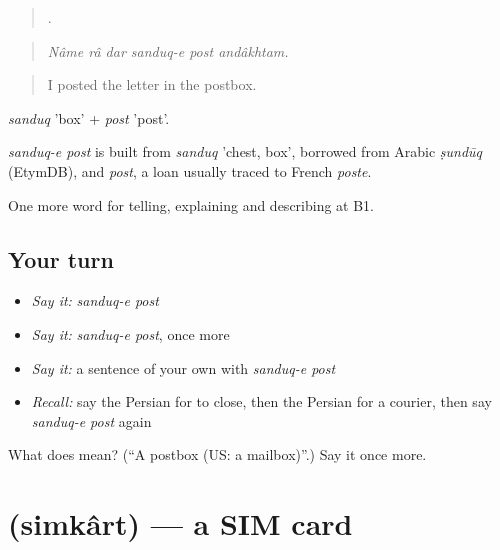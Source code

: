 \begin{quote}
     .
\end{quote}

\begin{quote}
\emph{Nâme râ dar sanduq-e post andâkhtam.}
\end{quote}

\begin{quote}
I posted the letter in the postbox.
\end{quote}

\emph{sanduq} 'box' + \emph{post} 'post'.

\begin{cousinweb}
\emph{sanduq-e post} is built from \emph{sanduq} 'chest, box', borrowed from Arabic \emph{ṣundūq} (EtymDB), and \emph{post}, a loan usually traced to French \emph{poste}.
\end{cousinweb}

\begin{grammarlens}[title={What you've built}]
One more word for telling, explaining and describing at B1.
\end{grammarlens}

\subsection*{Your turn}
\begin{itemize}
\raggedright
  \item \emph{Say it:} \emph{sanduq-e post}
  \item \emph{Say it:} \emph{sanduq-e post}, once more
  \item \emph{Say it:} a sentence of your own with \emph{sanduq-e post}
  \item \emph{Recall:} say the Persian for to close, then the Persian for a courier, then say \emph{sanduq-e post} again
\end{itemize}

\begin{tcolorbox}[breakable,colback=teal!4,colframe=teal!35!black,title={Before you move on}]
What does   mean? (\textquotedblleft{}A postbox (US: a mailbox)\textquotedblright{}.) Say it once more.
\end{tcolorbox}
\section[\texorpdfstring{\fa{سیم} \fa{کارت} (simkârt)}{سیم کارت (simkârt)}]{  (simkârt) — a SIM card}

